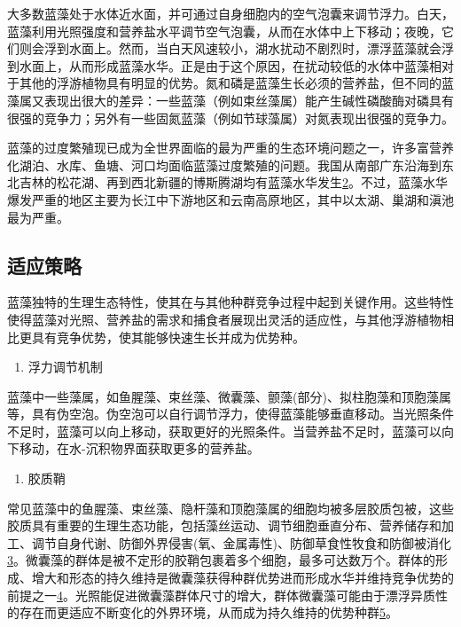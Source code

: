 \documentclass[
]{book}
\providecommand{\tightlist}{%
  \setlength{\itemsep}{0pt}\setlength{\parskip}{0pt}}
\begin{document}
大多数蓝藻处于水体近水面，并可通过自身细胞内的空气泡囊来调节浮力。白天，蓝藻利用光照强度和营养盐水平调节空气泡囊，从而在水体中上下移动；夜晚，它们则会浮到水面上。然而，当白天风速较小，湖水扰动不剧烈时，漂浮蓝藻就会浮到水面上，从而形成蓝藻水华。正是由于这个原因，在扰动较低的水体中蓝藻相对于其他的浮游植物具有明显的优势。氮和磷是蓝藻生长必须的营养盐，但不同的蓝藻属又表现出很大的差异：一些蓝藻（例如束丝藻属）能产生碱性磷酸酶对磷具有很强的竞争力；另外有一些固氮蓝藻（例如节球藻属）对氮表现出很强的竞争力。

蓝藻的过度繁殖现已成为全世界面临的最为严重的生态环境问题之一，许多富营养化湖泊、水库、鱼塘、河口均面临蓝藻过度繁殖的问题。我国从南部广东沿海到东北吉林的松花湖、再到西北新疆的博斯腾湖均有蓝藻水华发生\href{Kezhen\%20Qian,\%20Ajay\%20Kumar,\%20et.al.\%20Renew.\%20and\%20Sustain.\%20Energy\%20Reviews,\%202015,\%2042:\%201055-1064.}{2}。不过，蓝藻水华爆发严重的地区主要为长江中下游地区和云南高原地区，其中以太湖、巢湖和滇池最为严重。

\hypertarget{ux9002ux5e94ux7b56ux7565}{%
\subsection{适应策略}\label{ux9002ux5e94ux7b56ux7565}}

蓝藻独特的生理生态特性，使其在与其他种群竞争过程中起到关键作用。这些特性使得蓝藻对光照、营养盐的需求和捕食者展现出灵活的适应性，与其他浮游植物相比更具有竞争优势，使其能够快速生长并成为优势种。

\begin{enumerate}
\def\labelenumi{\arabic{enumi}.}
\tightlist
\item
  浮力调节机制
\end{enumerate}

蓝藻中一些藻属，如鱼腥藻、束丝藻、微囊藻、颤藻(部分)、拟柱胞藻和顶胞藻属等，具有伪空泡。伪空泡可以自行调节浮力，使得蓝藻能够垂直移动。当光照条件不足时，蓝藻可以向上移动，获取更好的光照条件。当营养盐不足时，蓝藻可以向下移动，在水-沉积物界面获取更多的营养盐。

\begin{enumerate}
\def\labelenumi{\arabic{enumi}.}
\setcounter{enumi}{1}
\tightlist
\item
  胶质鞘
\end{enumerate}

常见蓝藻中的鱼腥藻、束丝藻、隐杆藻和顶胞藻属的细胞均被多层胶质包被，这些胶质具有重要的生理生态功能，包括藻丝运动、调节细胞垂直分布、营养储存和加工、调节自身代谢、防御外界侵害(氧、金属毒性)、防御草食性牧食和防御被消化\href{Puga\%20A\%20P,\%20Abreu\%20C\%20A,\%20et\%20al.\%20J.\%20of\%20Environ.\%20Manage.,\%202015,\%20159:\%2086–93.}{3}。微囊藻的群体是被不定形的胶鞘包裹着多个细胞，最多可达数万个。群体的形成、增大和形态的持久维持是微囊藻获得种群优势进而形成水华并维持竞争优势的前提之一\href{Khan\%20S,\%20Cai\%20Chao,\%20et\%20al．\%20Environ.\%20Sci.\%20\&\%20Technol.,\%202013,\%2047\%20:\%208624-8632．}{4}。光照能促进微囊藻群体尺寸的增大，群体微囊藻可能由于漂浮异质性的存在而更适应不断变化的外界环境，从而成为持久维持的优势种群\href{Bi\%20H,\%20Huang\%20X,\%20et\%20al.\%20Small\%202014,\%2010,\%203544.}{5}。
\end{document}
